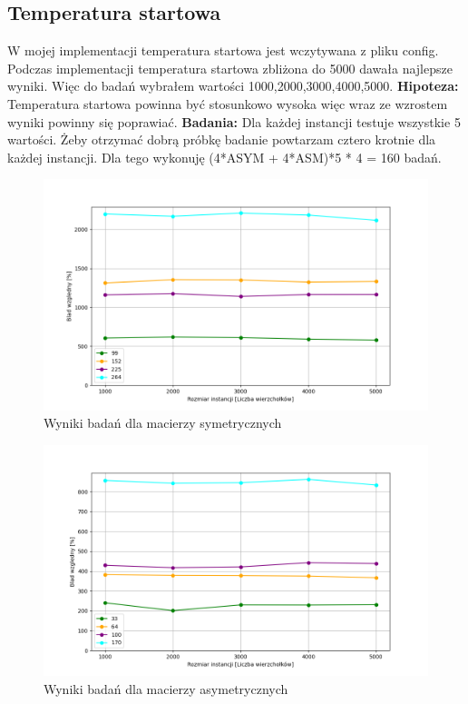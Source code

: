 \documentclass{article}
\begin{document}
      \subsection{Temperatura startowa}
        W mojej implementacji temperatura startowa jest wczytywana z pliku config.
        Podczas implementacji temperatura startowa zbliżona do 5000 dawała najlepsze 
        wyniki. Więc do badań wybrałem wartości 1000,2000,3000,4000,5000.\linebreak
        \textbf{Hipoteza: } Temperatura startowa powinna być stosunkowo wysoka
        więc wraz ze wzrostem wyniki powinny się poprawiać.\linebreak
        \textbf{Badania: } Dla każdej instancji testuje wszystkie 5 wartości. 
        Żeby otrzymać dobrą próbkę badanie powtarzam cztero krotnie dla każdej 
        instancji. Dla tego wykonuję (4*ASYM + 4*ASM)*5 * 4 = 160 badań.\linebreak
        \FloatBarrier
        
        \FloatBarrier
        \begin{figure}[ht]
          \centering
          \includegraphics[width=\textwidth]{src/plots/symAnStart.png}
          \caption{Wyniki badań dla macierzy symetrycznych}
          \label{fig:symStart}
        \end{figure}
        \begin{figure}[ht]
          \centering
          \includegraphics[width=\textwidth]{src/plots/asymAnStart.png}
          \caption{Wyniki badań dla macierzy asymetrycznych}
          \label{fig:asymStart}
        \end{figure}
\end{document}

